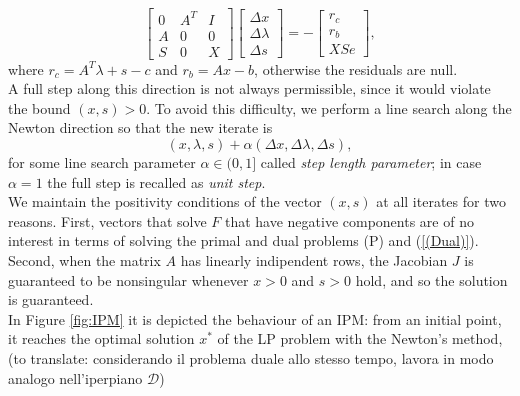 \documentclass[a4paper,10 pt,titlepage,twoside]{book}
\theoremstyle{plain}
\theoremstyle{definition}
\theoremstyle{remark}
\begin{document}
\begin{equation}\label{(5.1)}
	\begin{bmatrix}
0&A^{T}&I \\A&0&0\\S&0&X
	\end{bmatrix}\begin{bmatrix}
	\Delta x\\\Delta\lambda \\\Delta s
	\end{bmatrix}=-\begin{bmatrix}
	r_{c}\\r_{b}\\XSe
	\end{bmatrix},
\end{equation}
where $r_{c}= A^{T}\lambda+s-c$ and $r_{b}= Ax-b$, otherwise the residuals are null.\\
A full step along this direction is not always permissible, since it would violate the bound $(x,s)>0$. To avoid this difficulty, we perform a line search along the Newton direction so that the new iterate is
\begin{equation*}
	(x,\lambda,s) +\alpha (\Delta x,\Delta \lambda,\Delta s),
\end{equation*} 
for some line search parameter $\alpha \in (0,1]$ called \textit{step length parameter}; in case $\alpha = 1$ the full step is recalled as \textit{unit step}.\\We maintain the positivity conditions of the vector $(x,s)$ at all iterates for two reasons. First, vectors that solve $\mathit{F}$ that have negative components are of no interest in terms of solving the primal and dual problems (P) and (\ref{(Dual)}). Second, when the matrix $A$ has linearly indipendent rows, the Jacobian $J$ is guaranteed to be nonsingular whenever $x>0$ and $s>0$ hold, and so the solution is guaranteed. %
\\
In Figure \ref{fig:IPM} it is depicted the behaviour of an IPM: from an initial point, it reaches the optimal solution $x^{*}$ of the LP problem \label{LPexample} with the Newton's method, (to translate: considerando il problema duale allo stesso tempo, lavora in modo analogo nell'iperpiano $\mathcal{D}$)
\end{document}
